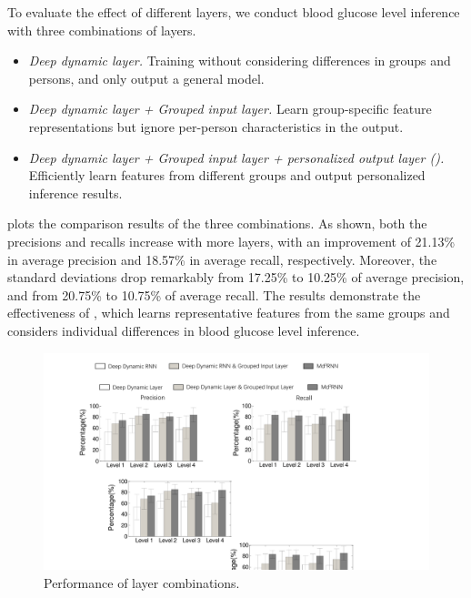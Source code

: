 To evaluate the effect of different layers, we conduct blood glucose level inference with three combinations of layers.
\begin{itemize}
  \item
  \emph{Deep dynamic layer.}
  Training without considering differences in groups and persons, and only output a general model.
  \item
  \emph{Deep dynamic layer + Grouped input layer.}
  Learn group-specific feature representations but ignore per-person characteristics in the output.
  \item
  \emph{Deep dynamic layer + Grouped input layer + personalized output layer (\modelname).}
  Efficiently learn features from different groups and output personalized inference results.
\end{itemize}
 plots the comparison results of the three combinations.
As shown, both the precisions and recalls increase with more layers, with an improvement of 21.13\% in average precision and 18.57\% in average recall, respectively.
Moreover, the standard deviations drop remarkably from 17.25\% to 10.25\%  of average precision, and from 20.75\% to 10.75\% of average recall.
The results demonstrate the effectiveness of \modelname, which learns representative features from the same groups and considers individual differences in blood glucose level inference.

\begin{figure}[h]
  \centering
  \includegraphics[width=0.9\columnwidth]{./img/CMP_Models2.pdf}
  \caption{Performance of layer combinations.}
  \label{fig:cmp_model}
\end{figure}

